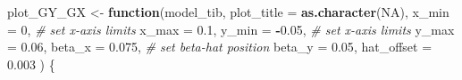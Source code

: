 \documentclass[
]{article}
\newenvironment{Shaded}{\begin{snugshade}}{\end{snugshade}}
\newcommand{\AttributeTok}[1]{\textcolor[rgb]{0.13,0.29,0.53}{#1}}
\newcommand{\CommentTok}[1]{\textcolor[rgb]{0.56,0.35,0.01}{\textit{#1}}}
\newcommand{\ConstantTok}[1]{\textcolor[rgb]{0.56,0.35,0.01}{#1}}
\newcommand{\ControlFlowTok}[1]{\textcolor[rgb]{0.13,0.29,0.53}{\textbf{#1}}}
\newcommand{\DecValTok}[1]{\textcolor[rgb]{0.00,0.00,0.81}{#1}}
\newcommand{\FloatTok}[1]{\textcolor[rgb]{0.00,0.00,0.81}{#1}}
\newcommand{\FunctionTok}[1]{\textcolor[rgb]{0.13,0.29,0.53}{\textbf{#1}}}
\newcommand{\NormalTok}[1]{#1}
\newcommand{\OtherTok}[1]{\textcolor[rgb]{0.56,0.35,0.01}{#1}}
\newcommand{\SpecialCharTok}[1]{\textcolor[rgb]{0.81,0.36,0.00}{\textbf{#1}}}
\begin{document}
\begin{Shaded}
\begin{Highlighting}[]
\NormalTok{ plot\_GY\_GX }\OtherTok{\textless{}{-}} \ControlFlowTok{function}\NormalTok{(model\_tib,}
                        \AttributeTok{plot\_title =} \FunctionTok{as.character}\NormalTok{(}\ConstantTok{NA}\NormalTok{),}
                        \AttributeTok{x\_min =} \DecValTok{0}\NormalTok{,                    }\CommentTok{\# set x{-}axis limits}
                        \AttributeTok{x\_max =} \FloatTok{0.1}\NormalTok{,}
                        \AttributeTok{y\_min =} \SpecialCharTok{{-}}\FloatTok{0.05}\NormalTok{,                }\CommentTok{\# set x{-}axis limits}
                        \AttributeTok{y\_max =} \FloatTok{0.06}\NormalTok{,}
                        \AttributeTok{beta\_x =} \FloatTok{0.075}\NormalTok{,               }\CommentTok{\# set beta{-}hat position}
                        \AttributeTok{beta\_y =} \FloatTok{0.05}\NormalTok{,}
                        \AttributeTok{hat\_offset =} \FloatTok{0.003}
\NormalTok{                        )}
\NormalTok{   \{}


\end{Highlighting}
\end{Shaded}
\end{document}
